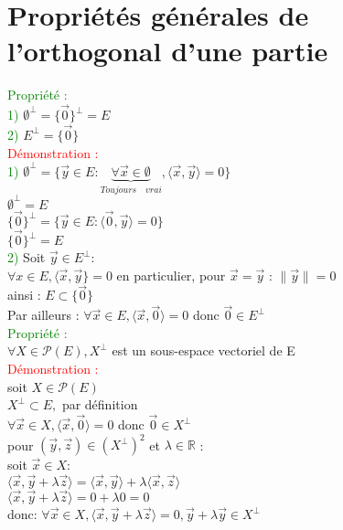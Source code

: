 \documentclass{article}
\begin{document}
\section{Propriétés générales de l'orthogonal d'une partie}
\textcolor{green}{Propriété :} \\
\textcolor{green}{1)} $\emptyset^{\perp}= \lbrace \vec 0 \rbrace^{\perp}=E$ \\
\textcolor{green}{2)} $E^{\perp}= \lbrace \vec 0 \rbrace$ \\
\textcolor{red}{Démonstration :} \\
\textcolor{green}{1)} $\emptyset^{\perp}= \lbrace \vec y \in E : \underbrace{\forall \vec x \in \emptyset }_{Toujours\quad vrai}, \langle \vec x , \vec y \rangle = 0 \rbrace$ \\
$\emptyset^{\perp}=E$ \\
$\lbrace \vec 0 \rbrace^{\perp}= \lbrace \vec y \in E : \langle \vec 0, \vec y \rangle =0 \rbrace $ \\
$\lbrace \vec 0 \rbrace^{\perp}= E$ \\
\textcolor{green}{2)} Soit $\vec y \in E^{\perp} :$ \\
$\forall x \in E, \langle \vec x, \vec y  \rbrace =0$ en particulier, pour $\vec x= \vec y$ : $\| \vec y \| = 0$ \\
ainsi : $E \subset \lbrace \vec 0 \rbrace$ \\
Par ailleurs : $\forall \vec x \in E, \langle \vec x ,\vec 0 \rangle =0$ donc $\vec 0 \in E^{\perp}$ \\
\textcolor{green}{Propriété :} \\
$\forall X \in \mathcal P (E), X^{\perp}$ est un sous-espace vectoriel de E \\
\textcolor{red}{Démonstration :} \\
soit $X \in \mathcal P(E)$ \\
$X^{\perp} \subset E,$ par définition \\
$\forall \vec x \in X, \langle \vec x ,\vec 0 \rangle = 0$ donc $\vec 0 \in X^{\perp}$ \\
pour $(\vec y, \vec z) \in (X^{\perp})^2$ et $\lambda \in \mathbb R$ : \\
soit $\vec x \in X :$ \\
$\langle \vec x , \vec y + \lambda \vec z \rangle = \langle \vec x, \vec y \rangle + \lambda \langle \vec x, \vec z \rangle$ \\
$\langle \vec x , \vec y + \lambda \vec z \rangle = 0 + \lambda 0=0$ \\
donc: $\forall \vec x \in X, \langle \vec x, \vec y + \lambda \vec z \rangle = 0, \vec y +\lambda \vec y \in X^{\perp}$ \\
\end{document}
